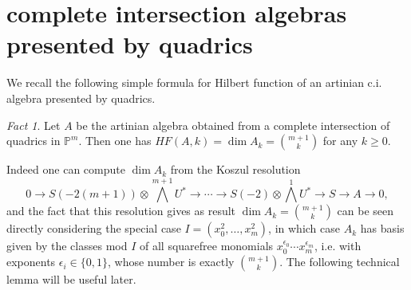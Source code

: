 \documentclass[10pt, a4paper]{amsart}
\theoremstyle{plain}
\theoremstyle{definition}
\theoremstyle{remark}
\newtheorem*{fact}{Fact}
\def\PP{\mathbb{P}}
\begin{document}
 \section{complete intersection algebras presented by quadrics}\label{sec:d=2}
 We recall the following simple formula for Hilbert function of an artinian c.i. algebra presented by quadrics. 
 \begin{fact}\label{fact:HF} Let $A$ be the artinian algebra obtained from a complete intersection of quadrics in $\PP^m$. Then one has $HF(A,k)=\dim A_k={m+1\choose k}$ for any $k\geq 0$.
 \end{fact}
Indeed one can compute $\dim A_k$ from the Koszul resolution
 $$0\to S(-2(m+1))\otimes \bigwedge^{m+1}U^\ast\to \cdots\to S(-2)\otimes \bigwedge^1U^\ast\to S\to A\to 0,$$ and
  the fact that this resolution gives as result $\dim A_k={m+1\choose k}$ can be seen directly considering the special case $I=(x_0^2,\ldots,x_m^2)$, in which case $A_k$ has basis given by the classes mod $I$ of all squarefree monomials $x_0^{\epsilon_0}\cdots x_m^{\epsilon_m}$, i.e. with exponents  $\epsilon_i\in\{0,1\}$, whose number is exactly ${m+1\choose k}$. 
\vskip2mm
 The following technical lemma will be useful later.
\end{document}
